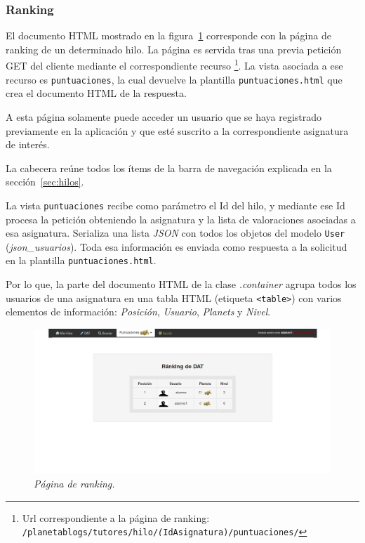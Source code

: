 \documentclass[a4paper, 12pt]{book}
\begin{document}
\subsubsection{Ranking} 
\label{sec:ranking}
El documento HTML mostrado en la figura~\ref{fig:ranking} corresponde con la p\'agina de ranking de un determinado hilo. 
La p\'agina es servida tras una previa petici\'on GET del cliente mediante el correspondiente recurso \footnote{Url correspondiente a la p\'agina de 
ranking: \texttt{/planetablogs/tutores/hilo/\textit(IdAsignatura)/puntuaciones/}}. La vista asociada a ese recurso es \texttt{puntuaciones}, la cual 
devuelve la plantilla \texttt{puntuaciones.html} que crea el documento HTML de la respuesta.

A esta p\'agina solamente puede acceder un usuario que se haya registrado previamente en la aplicaci\'on y que est\'e suscrito a la
correspondiente asignatura de inter\'es.

La cabecera re\'une todos los \'items de la barra de navegaci\'on explicada en la secci\'on~\ref{sec:hilos}. 

La vista \texttt{puntuaciones} recibe como par\'ametro el Id del hilo, y mediante ese Id procesa la petici\'on obteniendo la asignatura y la lista 
de valoraciones asociadas a esa asignatura. Serializa una lista \textit{JSON} con todos los objetos del modelo \texttt{User} (\textit{json\_usuarios}).
Toda esa informaci\'on es enviada como respuesta a la solicitud en la plantilla \texttt{puntuaciones.html}. 

Por lo que, la parte del documento HTML de la clase \textit{.container} agrupa todos los usuarios de una asignatura en una tabla HTML (etiqueta 
\texttt{<table>}) con varios elementos de informaci\'on: \textit{Posici\'on}, \textit{Usuario}, \textit{Planets} y \textit{Nivel}.

\begin{figure}
  \centering
  \includegraphics[width=17cm, keepaspectratio]{imagenes/HiloAlumnoRanking}
  \caption{\textit{P\'agina de ranking.}}
  \label{fig:ranking}
\end{figure}
\end{document}
